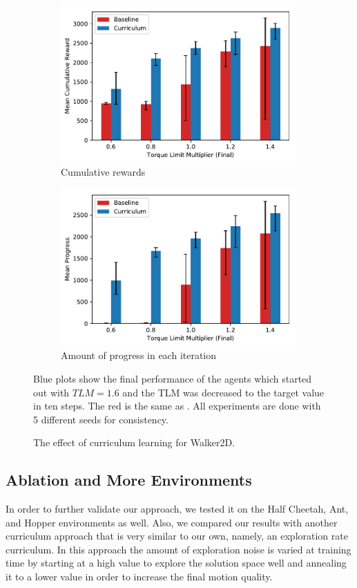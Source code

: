 \begin{figure}
    \centering
    \begin{subfigure}[t]{\textwidth}
        \centering
        \includegraphics[width=90mm]{img/TorqueLimit_Curr_Reward.pdf}
        \caption{Cumulative rewards}
    \end{subfigure}
    \begin{subfigure}[t]{\textwidth}
        \centering
        \includegraphics[width=90mm]{img/TorqueLimit_Curr_Progress.pdf}
        \caption{Amount of progress in each iteration}
        \label{fig:torque_limit_curr_b}
    \end{subfigure}
    \caption{The effect of curriculum learning for Walker2D.}{Blue plots show the final performance of the agents which started out with $TLM=1.6$ and the \ac{TLM} was decreased to the target value in ten steps. The red is the same as . All experiments are done with 5 different seeds for consistency.}
    \label{fig:torque_limit_curr}
\end{figure}


\subsection{Ablation and More Environments}

In order to further validate our approach, we tested it on the Half Cheetah, Ant, and Hopper environments as well. Also, we compared our results with another curriculum approach that is very similar to our own, namely, an exploration rate curriculum. In this approach the amount of exploration noise is varied at training time by starting at a high value to explore the solution space well and annealing it to a lower value in order to increase the final motion quality.

